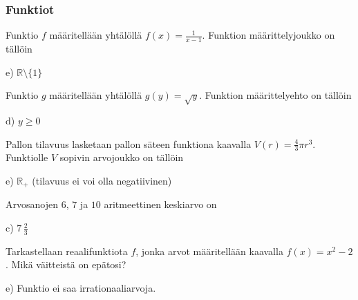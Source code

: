 \subsubsection*{Funktiot}


\begin{tehtava}
Funktio $f$ määritellään yhtälöllä $f(x)=\frac{1}{x-1}$. Funktion määrittelyjoukko on tällöin
    \begin{vastaus}
	 e) $\mathbb{R}\setminus \lbrace 1 \rbrace$
    \end{vastaus}
\end{tehtava}

\begin{tehtava}
Funktio $g$ määritellään yhtälöllä $g(y)=\sqrt{y}$. Funktion määrittelyehto on tällöin
    \begin{vastaus}
	 d) $y\geq 0$
    \end{vastaus}
\end{tehtava}

\begin{tehtava}
Pallon tilavuus lasketaan pallon säteen funktiona kaavalla $V(r)=\frac{4}{3}\pi r^3$. Funktiolle $V$ sopivin arvojoukko on tällöin
	\begin{vastaus}
	e) $\mathbb{R}_+$ (tilavuus ei voi olla negatiivinen)
	\end{vastaus}
\end{tehtava}

\begin{tehtava}
Arvosanojen $6$, $7$ ja $10$ aritmeettinen keskiarvo on
	\begin{vastaus}
	c) $7\,\frac{2}{3}$
	\end{vastaus}
\end{tehtava}

\begin{tehtava}
Tarkastellaan reaalifunktiota $f$, jonka arvot määritellään kaavalla $f(x)=x^2-2$. Mikä väitteistä on epätosi?
	\begin{vastaus}
	e) Funktio ei saa irrationaaliarvoja.
	\end{vastaus}
\end{tehtava}

